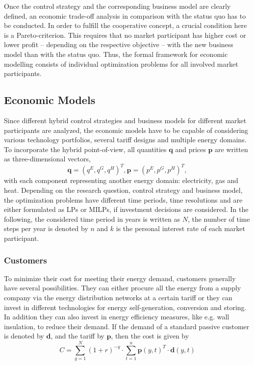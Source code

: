 \documentclass[conference]{IEEEtran}
\begin{document}
Once the control strategy and the corresponding business model are
clearly defined, an economic trade-off analysis in comparison with the
status quo has to be conducted. In order to fulfill the cooperative
concept, a  crucial condition here is a Pareto-criterion. This
requires that no market participant has higher cost or lower profit –
depending on the respective objective – with the new business model
than with the status quo. Thus, the formal framework for economic
modelling consists of individual optimization problems for all
involved market participants. 

\subsection{Economic Models}
\label{sec:econ-3}
Since different hybrid control strategies and business models for
different market participants are analyzed, the economic models have
to be capable of considering various technology portfolios, several
tariff designs and multiple energy domains. To incorporate the hybrid
point-of-view, all quantities $\mathbf{q}$ and prices $\mathbf{p}$ are written as
three-dimensional vectors,
\begin{equation*}
  \mathbf{q}=(q^E, q^G, q^H )^T , \mathbf{p}=(p^E, p^G, p^H )^T , 
\end{equation*}
with each component representing another energy domain: electricity,
gas and heat. Depending on the research question, control strategy and
business model, the optimization problems have different time periods,
time resolutions and are either formulated as LPs or MILPs, if
investment decisions are considered. In the following, the considered
time period in years is written as $N$, the number of time steps per
year is denoted by $n$ and $k$ is the personal interest rate of each
market participant. 

\subsubsection{Customers}
To minimize their cost for meeting their energy demand, customers
generally have several possibilities. They can either procure all the
energy from a supply company via the energy distribution networks at a
certain tariff or they can invest in different technologies for energy
self-generation, conversion and storing. In addition they can also
invest in energy efficiency measures, like e.g. wall insulation, to
reduce their demand. If the demand of a standard passive customer is
denoted by $\mathbf{d}$, and the tariff by $\mathbf{p}$, then the cost is given by 
\begin{equation*}
  C = \sum_{y=1}^{N}(1+r)^{-y} \cdot \sum_{t=1}^{n} \mathbf{p}(y,t)^{T} \cdot \mathbf{d}(y,t)
\end{equation*}
\end{document}
